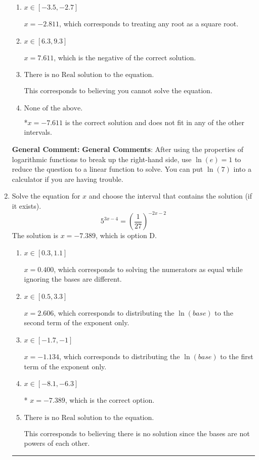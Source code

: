 \documentclass{extbook}[14pt]
\newcommand{\litem}[1]{\item #1

\rule{\textwidth}{0.4pt}}
\begin{document}
\begin{enumerate}
{\begin{enumerate}[label=\Alph*.]
$x = -2.469$, which corresponds to thinking you need to take the natural log of the left side before reducing.
\item \( x \in [-3.5, -2.7] \)

$x = -2.811$, which corresponds to treating any root as a square root.
\item \( x \in [6.3, 9.3] \)

$x = 7.611$, which is the negative of the correct solution.
\item \( \text{There is no Real solution to the equation.} \)

This corresponds to believing you cannot solve the equation.
\item \( \text{None of the above.} \)

*$x = -7.611$ is the correct solution and does not fit in any of the other intervals.
\end{enumerate}

\textbf{General Comment:} \textbf{General Comments}: After using the properties of logarithmic functions to break up the right-hand side, use $\ln(e) = 1$ to reduce the question to a linear function to solve. You can put $\ln(7)$ into a calculator if you are having trouble.
}
\litem{
Solve the equation for $x$ and choose the interval that contains the solution (if it exists).
\[ 5^{3x-4} = \left(\frac{1}{27}\right)^{-2x-2} \]The solution is \( x = -7.389 \), which is option D.\begin{enumerate}[label=\Alph*.]
\item \( x \in [0.3, 1.1] \)

$x = 0.400$, which corresponds to solving the numerators as equal while ignoring the bases are different.
\item \( x \in [0.5, 3.3] \)

$x = 2.606$, which corresponds to distributing the $\ln(base)$ to the second term of the exponent only.
\item \( x \in [-1.7, -1] \)

$x = -1.134$, which corresponds to distributing the $\ln(base)$ to the first term of the exponent only.
\item \( x \in [-8.1, -6.3] \)

* $x = -7.389$, which is the correct option.
\item \( \text{There is no Real solution to the equation.} \)

This corresponds to believing there is no solution since the bases are not powers of each other.
\end{enumerate}

}
\end{enumerate}
\end{document}

